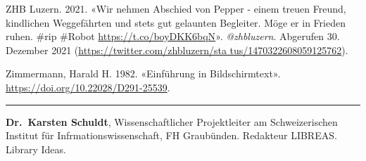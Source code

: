 \documentclass[a4paper,
fontsize=11pt,
oneside,
numbers=noperiodatend,
parskip=half-,
bibliography=totoc,
final
]{scrartcl}
\begin{document}
ZHB Luzern. 2021. «Wir nehmen Abschied von Pepper - einem treuen Freund,
kindlichen Weggefährten und stets gut gelaunten Begleiter. Möge er in
Frieden ruhen. \#rip \#Robot \url{https://t.co/boyDKK6bqN}».
\emph{@zhbluzern}. Abgerufen 30. Dezember 2021
(\href{https://twitter.com/zhbluzern/status/1470322608059125762}{https://twitter.com/zhbluzern/sta tus/1470322608059125762}).

Zimmermann, Harald H. 1982. «Einführung in Bildschirmtext».
\url{https://doi.org/10.22028/D291-25539}.

\begin{center}\rule{0.5\linewidth}{0.5pt}\end{center}

\textbf{Dr.~Karsten Schuldt}, Wissenschaftlicher Projektleiter am
Schweizerischen Institut für Infrmationswissenschaft, FH Graubünden.
Redakteur LIBREAS. Library Ideas.
\end{document}
